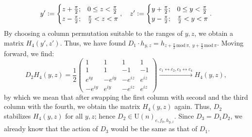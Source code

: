 \documentclass[referee,sn-mathphys-num]{sn-jnl}%
\theoremstyle{thmstyleone}%
\theoremstyle{thmstyletwo}%
\theoremstyle{remark}
\theoremstyle{thmstylethree}%
\newcommand{\defeq}{\vcentcolon=}
\begin{document}
\begin{equation}
	y' \defeq \begin{cases}
		z + \frac{\pi}{2} ; & 0 \leq z < \frac{\pi}{2} \\
		z - \frac{\pi}{2} ; & \frac{\pi}{2} < z < \pi
	\end{cases} , \quad z' \defeq \begin{cases}
	y + \frac{\pi}{2} ; & 0 \leq y < \frac{\pi}{2} \\
	y - \frac{\pi}{2} ; & \frac{\pi}{2} < y < \pi
\end{cases} .
\end{equation}
By choosing a column permutation suitable to the ranges of $y,z$, we obtain a matrix $ H_4 \left( y', z' \right) $. Thus, we have found $ D_1 \cdot h_{y,z} = h_{z + \frac{\pi}{2} \, \mathrm{mod} \, \pi, \; y + \frac{\pi}{2} \, \mathrm{mod} \, \pi} $.
Moving forward, we find:
\begin{equation}
	D_2 H_4 \left( y, z \right) = \frac{1}{2} \begin{pmatrix}
		1 & 1 & 1 & 1 \\
		1 & 1 & -1 & -1 \\
		e^{i y} & -e^{i y} & -e^{i z} & e^{i z} \\
		-e^{i y} & e^{i y} & -e^{i z} & e^{i z}
	\end{pmatrix} \xrightarrow{c_1 \leftrightarrow c_2, c_3 \leftrightarrow c_4} H_4 \left( y, z \right) ,
\end{equation}
by which we mean that after swapping the first column with second and the third column with the fourth, we obtain the matrix $ H_4 \left( y, z \right) $ again. Thus, $ D_2 $ stabilizes $ H_4 \left( y, z \right) $ for all $y,z$; hence $ D_2 \in \mathrm{U} \left( n \right)_{e, f_0, h_{y,z}} $. Since $ D_3 = D_1 D_2 $, we already know that the action of $D_3$ would be the same as that of $D_1$.
\end{document}
